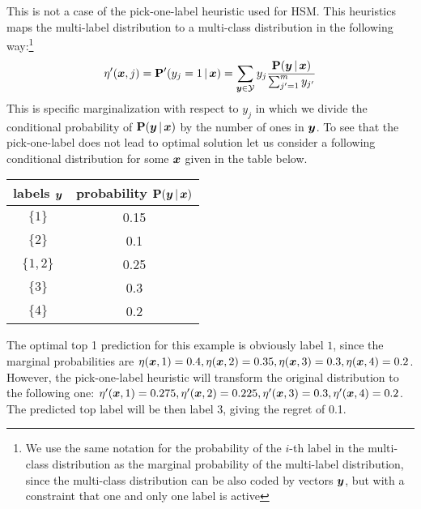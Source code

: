 \documentclass{article}
\newcommand{\prob}{\mathbf{P}}
\begin{document}
This is not a case of the pick-one-label heuristic used for HSM. This heuristics maps the multi-label distribution to a multi-class distribution in the following way:\footnote{We use the same notation for the probability of the $i$-th label in the multi-class distribution as the marginal probability of the multi-label distribution, since the multi-class distribution can be also coded by vectors $\boldsymbol{y}$, but with a constraint that one and only one label is active}
$$
\eta'(\bx, j) = \prob'(y_j = 1 \given \bx) = \sum_{\by \in \calY} y_j \frac{\prob(\by \given \bx)}{\sum_{j'=1}^m y_{j'}}
$$
This is specific marginalization with respect to $y_j$ in which we divide the conditional probability of  $\prob(\by \given \bx)$ by the number of ones in $\boldsymbol{y}$. To see that the pick-one-label does not lead to optimal solution let us consider a following conditional distribution for some $\boldsymbol{x}$ given in the table below.
\begin{center}
\begin{tabular}{c c}
\toprule
labels $\boldsymbol{y}$ & probability $\prob(\by \given \bx)$ \\
\midrule
$\{1\}$ & 0.15 \\
$\{2\}$ & 0.1 \\
$\{1, 2\}$ & 0.25 \\
$\{3\}$ & 0.3 \\
$\{4\}$ & 0.2 \\
\bottomrule
\end{tabular}
\end{center}
The optimal top 1 prediction for this example is obviously label $1$, since the marginal probabilities are $\eta(\boldsymbol{x},1) = 0.4, \eta(\boldsymbol{x},2) = 0.35,  \eta(\boldsymbol{x},3) = 0.3, \eta(\boldsymbol{x},4) =0.2$. However, the pick-one-label heuristic will transform the original distribution to the following one: $\eta'(\boldsymbol{x},1) = 0.275, \eta'(\boldsymbol{x},2) = 0.225,  \eta'(\boldsymbol{x},3) = 0.3, \eta'(\boldsymbol{x},4) =0.2$. The predicted top label will be then label $3$, giving the regret of 0.1. 

\end{document}
